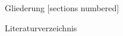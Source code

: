 \documentclass[german,smaller, aspectratio=169,c,allowframebreaks]{beamer}
\title[Paper Presentation]{\paperTitle}
\author{\paperAuthors}
\institute{Hochschule Zittau-Görlitz}
\date[Juni 2025]{\paperConference, \paperPublishedYear}
\begin{document}
\begin{frame}[plain]
    \titlepage
\end{frame}

\begin{frame}{Gliederung}
    [sections numbered]
    \tableofcontents[hideallsubsections]
\end{frame}



\begin{frame}[t,allowframebreaks]{Literaturverzeichnis}
    \nocite{*}
    \small
    \printbibliography
\end{frame}
\end{document}
